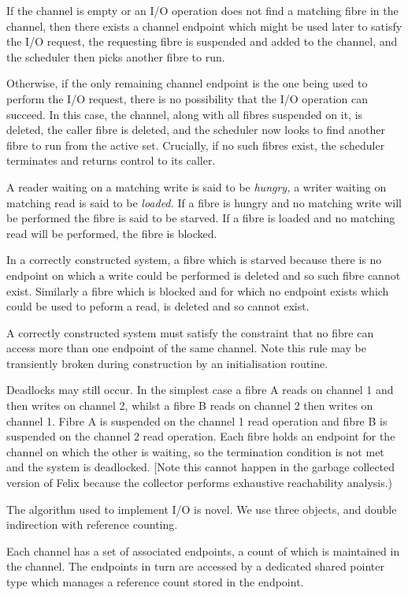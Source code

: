 \documentclass[oneside]{book}
\begin{document}
If the channel is empty or an I/O operation does not find a matching fibre
in the channel, then there exists a channel endpoint which might be used
later to satisfy the I/O request, the requesting fibre is suspended and
added to the channel, and the scheduler then picks another fibre to run.

Otherwise, if the only remaining channel endpoint is the one being
used to perform the I/O request, there is no possibility that the
I/O operation can succeed. In this case, the channel, along with all
fibres suspended on it, is deleted, the caller fibre is deleted,
and the scheduler now looks to find another fibre to run from
the active set. Crucially, if no such fibres exist, the scheduler
terminates and returns control to its caller.

A reader waiting on a matching write is said to be {\em hungry,}
a writer waiting on matching read is said to be {\em loaded.}
If a fibre is hungry and no matching write will be performed
the fibre is said to be starved. If a fibre is loaded and no
matching read will be performed, the fibre is blocked.

In a correctly constructed system, a fibre which is starved because there is no
endpoint on which a write could be performed is deleted and so
such fibre cannot exist. Similarly a fibre which is blocked
and for which no endpoint exists which could be used to
peform a read, is deleted and so cannot exist.

A correctly constructed system must satisfy the constraint that
no fibre can access more than one endpoint of the same channel.
Note this rule may be transiently broken during construction
by an initialisation routine.

Deadlocks may still occur. In the simplest case a fibre A
reads on channel 1 and then writes on channel 2, whilst a fibre
B reads on channel 2 then writes on channel 1. Fibre A is suspended
on the channel 1 read operation and fibre B is suspended on the
channel 2 read operation. Each fibre holds an endpoint for the channel
on which the other is waiting, so the termination condition is not met
and the system is deadlocked. [Note this cannot happen in the garbage
collected version of Felix because the collector performs exhaustive
reachability analysis.)

The algorithm used to implement I/O is novel. We use three objects,
and double indirection with reference counting.

Each channel has a set of associated endpoints, a count of which
is maintained in the channel. The endpoints in turn are accessed
by a dedicated shared pointer type which manages a reference count
stored in the endpoint.
\end{document}
